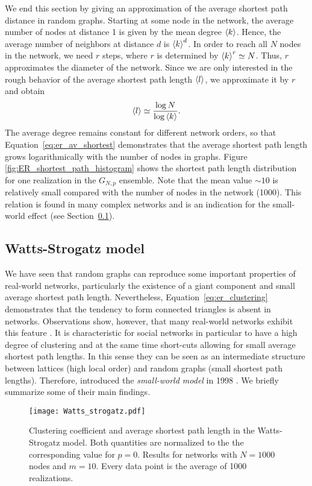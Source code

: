 We end this section by giving an approximation of the average shortest path distance in random graphs. 
Starting at some node in the network, the average number of nodes at distance 1 is given by the mean degree $\left< k \right>$. 
Hence, the average number of neighbors at distance $d$ is $\left< k \right>^d$.
In order to reach all $N$ nodes in the network, we need $r$ steps, where $r$ is determined by $\left< k \right>^r\simeq N$.
Thus, $r$ approximates the diameter of the network.
Since we are only interested in the rough behavior of the average shortest path length $\left< l \right>$, we approximate it by $r$ \citep{dynamical_processes} and obtain 
\begin{equation}\label{eq:er_av_shortest}
\left< l \right>\simeq \frac{\log N}{\log \left< k \right>}.
\end{equation}
The average degree remains constant for different network orders, so that Equation~\eqref{eq:er_av_shortest} demonstrates that the average shortest path length grows logarithmically with the number of nodes in \ER graphs.
Figure \ref{fig:ER_shortest_path_histogram} shows the shortest path length distribution for one realization in the $G_{N,p}$ ensemble.
Note that the mean value $\sim 10$ is relatively small compared with the number of nodes in the network (1000).
This relation is found in many complex networks and is an indication for the small-world effect (see Section~\ref{sec:watts_strogatz_model}).

\subsection{Watts-Strogatz model}\label{sec:watts_strogatz_model}
We have seen that random graphs can reproduce some important properties of real-world networks, particularly the existence of a giant component and small average shortest path length.
Nevertheless, Equation~\eqref{eq:er_clustering} demonstrates that the tendency to form connected triangles is absent in \ER networks.
Observations show, however, that many real-world networks exhibit this feature \citep{Milgram:1967,WassermanFaust,Newman2003}.
It is characteristic for social networks in particular to have a high degree of clustering and at the same time short-cuts allowing for small average shortest path lengths.
In this sense they can be seen as an intermediate structure between lattices (high local order) and random graphs (small shortest path lengths).
Therefore, \citeauthor{Watts:1998} introduced the \emph{small-world model} in 1998 \citep{Watts:1998}.
We briefly summarize some of their main findings.
%
\begin{SCfigure}
\texttt{[image: Watts\_strogatz.pdf]}
\caption{Clustering coefficient and average shortest path length in the Watts-Strogatz model.
Both quantities are  normalized to the the corresponding value for $p=0$.
Results for networks with $N=1000$ nodes and $m=10$.
Every data point is the average of 1000 realizations.}
\label{fig:watts_strogatz}
\end{SCfigure}

